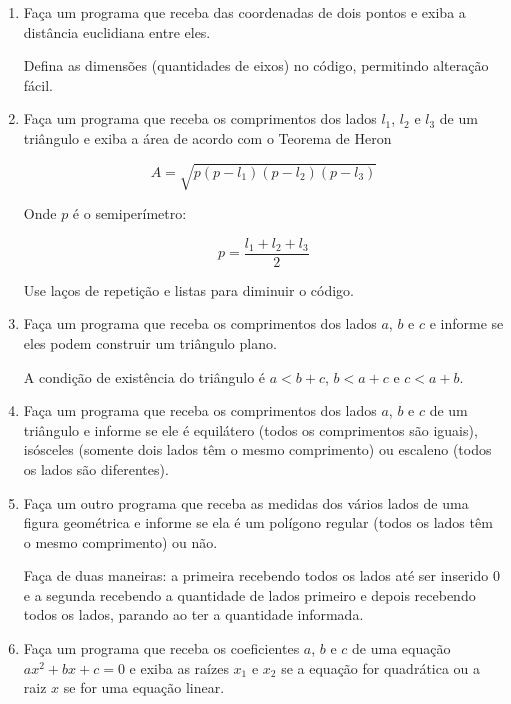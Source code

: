 \begin{enumerate}
	\item Faça um programa que receba das coordenadas de dois pontos e exiba a distância euclidiana entre eles. 
	
	Defina as dimensões (quantidades de eixos) no código, permitindo alteração fácil.	

\quebra	
	
	\item Faça um programa que receba os comprimentos dos lados $l_1$, $l_2$ e $l_3$ de um triângulo e exiba a área de acordo com o Teorema de Heron
	
	\begin{equation*}
		A = \sqrt{p(p-l_1)(p-l_2)(p-l_3)}
	\end{equation*}	
	
	Onde $p$ é o semiperímetro:
	
	\begin{equation*}
		p = \frac{l_1+l_2+l_3}{2}
	\end{equation*}
	
	Use laços de repetição e listas para diminuir o código.
	
\quebra	
	
	\item Faça um programa que receba os comprimentos dos lados $a$, $b$ e $c$ e informe se eles podem construir um triângulo plano.
	
	A condição de existência do triângulo é $a < b + c$, $b < a + c$ e $c < a + b$.
	
	\item Faça um programa que receba os comprimentos dos lados $a$, $b$ e $c$ de um triângulo e informe se ele é 
	equilátero (todos os comprimentos são iguais), 
	isósceles (somente dois lados têm o mesmo comprimento)
	ou escaleno (todos os lados são diferentes).
	
	\item Faça um outro programa que receba as medidas dos vários lados de uma figura geométrica e informe se ela é um polígono regular (todos os lados têm o mesmo comprimento) ou não.
	
	Faça de duas maneiras: 
	a primeira recebendo todos os lados até ser inserido 0 
	e a segunda recebendo a quantidade de lados primeiro e depois recebendo todos os lados, parando ao ter a quantidade informada. 
	 


	\item Faça um programa que receba os coeficientes $a$, $b$ e $c$ de uma equação $ax^2 + bx + c = 0$ e exiba as raízes $x_1$ e $x_2$ se a equação for quadrática ou a raiz $x$ se for uma equação linear.
	

\end{enumerate}
